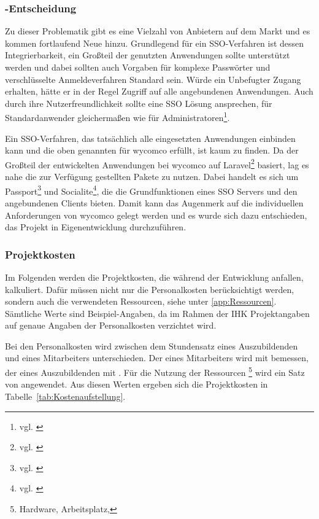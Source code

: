 \subsubsection{-Entscheidung}
\label{sec:MakeOrBuyEntscheidung}

Zu dieser Problematik gibt es eine Vielzahl von Anbietern auf dem Markt und es kommen fortlaufend Neue hinzu. 
Grundlegend für ein \acs{SSO}-Verfahren ist dessen Integrierbarkeit, ein Großteil der genutzten Anwendungen sollte unterstützt werden und dabei sollten auch Vorgaben für komplexe Passwörter und verschlüsselte Anmeldeverfahren Standard sein. Würde ein Unbefugter Zugang erhalten, hätte er in der Regel Zugriff auf alle angebundenen Anwendungen.
Auch durch ihre Nutzerfreundlichkeit sollte eine \acs{SSO} Lösung ansprechen, für Standardanwender gleichermaßen wie für Administratoren\footnote{vgl. \cite{computerwoche}}.

Ein \acs{SSO}-Verfahren, das tatsächlich alle eingesetzten Anwendungen einbinden kann und die oben genannten für wycomco erfüllt, ist kaum zu finden. Da der Großteil der entwickelten Anwendungen bei wycomco auf Laravel\footnote{vgl. \cite{Laravel}} basiert, lag es nahe die zur Verfügung gestellten Pakete zu nutzen. Dabei handelt es sich um Passport\footnote{vgl. \cite{Passport}} und Socialite\footnote{vgl. \cite{Socialite}}, die die Grundfunktionen eines SSO Servers und den angebundenen Clients bieten. Damit kann das Augenmerk auf die individuellen Anforderungen von wycomco gelegt werden und es wurde sich dazu entschieden, das Projekt in Eigenentwicklung durchzuführen.


\subsubsection{Projektkosten}
\label{sec:Projektkosten}

Im Folgenden werden die Projektkosten, die während der Entwicklung anfallen, kalkuliert. 
Dafür müssen nicht nur die Personalkosten berücksichtigt werden, sondern auch die verwendeten Ressourcen, siehe unter \ref{app:Ressourcen}. Sämtliche Werte sind Beispiel-Angaben, da im Rahmen der IHK Projektangaben auf genaue Angaben der Personalkosten verzichtet wird. 

Bei den Personalkosten wird zwischen dem Stundensatz eines Auszubildenden und eines Mitarbeiters unterschieden. Der eines Mitarbeiters wird mit  bemessen, der eines Auszubildenden mit .
Für die Nutzung der Ressourcen \footnote{Hardware, Arbeitsplatz, \etc} wird ein Satz von  angewendet.
Aus diesen Werten ergeben sich die Projektkosten in Tabelle~\ref{tab:Kostenaufstellung}.

